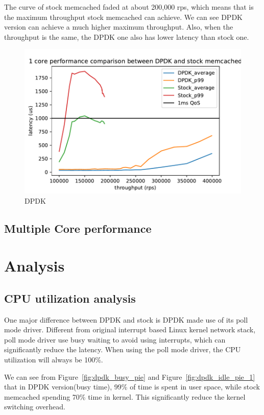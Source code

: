 \documentclass[bsc,frontabs,twoside,singlespacing,parskip,deptreport]{infthesis}     %
\begin{document}
The curve of stock memcached faded at about 200,000 rps, which means that is the maximum throughput stock memcached can achieve. We can see DPDK version can achieve a much higher maximum throughput. Also, when the throughput is the same, the DPDK one also has lower latency than stock one.

\begin{figure}[h]

	\includegraphics{figure/dpdk_1.pdf}
	\caption{DPDK}
	\label{fig:dpdk_1}
\end{figure}

\subsection{Multiple Core performance}

\section{Analysis}

\subsection{CPU utilization analysis}

One major difference between DPDK and stock is DPDK made use of its poll mode driver. Different from original interrupt based Linux kernel network stack, poll mode driver use busy waiting to avoid using interrupts, which can significantly reduce the latency. When using the poll mode driver, the CPU utilization will always be 100\%. 

We can see from Figure~\ref{fig:dpdk_busy_pie} and Figure~\ref{fig:dpdk_idle_pie_1} that in DPDK version(busy time), 99\% of time is spent in user space, while stock memcached spending 70\% time in kernel. This significantly reduce the kernel switching overhead.
\end{document}
